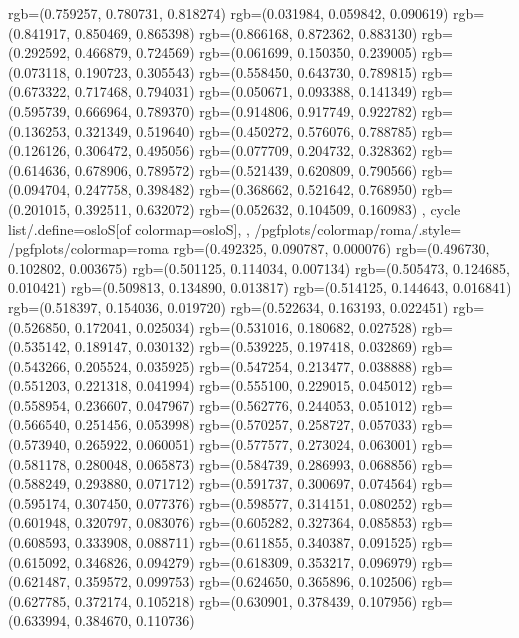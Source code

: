 {{{					rgb=(0.759257, 0.780731, 0.818274)
					rgb=(0.031984, 0.059842, 0.090619)
					rgb=(0.841917, 0.850469, 0.865398)
					rgb=(0.866168, 0.872362, 0.883130)
					rgb=(0.292592, 0.466879, 0.724569)
					rgb=(0.061699, 0.150350, 0.239005)
					rgb=(0.073118, 0.190723, 0.305543)
					rgb=(0.558450, 0.643730, 0.789815)
					rgb=(0.673322, 0.717468, 0.794031)
					rgb=(0.050671, 0.093388, 0.141349)
					rgb=(0.595739, 0.666964, 0.789370)
					rgb=(0.914806, 0.917749, 0.922782)
					rgb=(0.136253, 0.321349, 0.519640)
					rgb=(0.450272, 0.576076, 0.788785)
					rgb=(0.126126, 0.306472, 0.495056)
					rgb=(0.077709, 0.204732, 0.328362)
					rgb=(0.614636, 0.678906, 0.789572)
					rgb=(0.521439, 0.620809, 0.790566)
					rgb=(0.094704, 0.247758, 0.398482)
					rgb=(0.368662, 0.521642, 0.768950)
					rgb=(0.201015, 0.392511, 0.632072)
					rgb=(0.052632, 0.104509, 0.160983)
			},
		cycle list/.define={osloS}{[of colormap=osloS]},
		},
		/pgfplots/colormap/roma/.style={
			/pgfplots/colormap={roma}{%
					rgb=(0.492325, 0.090787, 0.000076)
					rgb=(0.496730, 0.102802, 0.003675)
					rgb=(0.501125, 0.114034, 0.007134)
					rgb=(0.505473, 0.124685, 0.010421)
					rgb=(0.509813, 0.134890, 0.013817)
					rgb=(0.514125, 0.144643, 0.016841)
					rgb=(0.518397, 0.154036, 0.019720)
					rgb=(0.522634, 0.163193, 0.022451)
					rgb=(0.526850, 0.172041, 0.025034)
					rgb=(0.531016, 0.180682, 0.027528)
					rgb=(0.535142, 0.189147, 0.030132)
					rgb=(0.539225, 0.197418, 0.032869)
					rgb=(0.543266, 0.205524, 0.035925)
					rgb=(0.547254, 0.213477, 0.038888)
					rgb=(0.551203, 0.221318, 0.041994)
					rgb=(0.555100, 0.229015, 0.045012)
					rgb=(0.558954, 0.236607, 0.047967)
					rgb=(0.562776, 0.244053, 0.051012)
					rgb=(0.566540, 0.251456, 0.053998)
					rgb=(0.570257, 0.258727, 0.057033)
					rgb=(0.573940, 0.265922, 0.060051)
					rgb=(0.577577, 0.273024, 0.063001)
					rgb=(0.581178, 0.280048, 0.065873)
					rgb=(0.584739, 0.286993, 0.068856)
					rgb=(0.588249, 0.293880, 0.071712)
					rgb=(0.591737, 0.300697, 0.074564)
					rgb=(0.595174, 0.307450, 0.077376)
					rgb=(0.598577, 0.314151, 0.080252)
					rgb=(0.601948, 0.320797, 0.083076)
					rgb=(0.605282, 0.327364, 0.085853)
					rgb=(0.608593, 0.333908, 0.088711)
					rgb=(0.611855, 0.340387, 0.091525)
					rgb=(0.615092, 0.346826, 0.094279)
					rgb=(0.618309, 0.353217, 0.096979)
					rgb=(0.621487, 0.359572, 0.099753)
					rgb=(0.624650, 0.365896, 0.102506)
					rgb=(0.627785, 0.372174, 0.105218)
					rgb=(0.630901, 0.378439, 0.107956)
					rgb=(0.633994, 0.384670, 0.110736)
}}}
